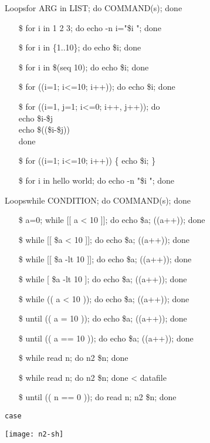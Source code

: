 \begin{frame}{Loops}{\ttfamily for ARG in LIST; do COMMAND(s); done}\small\ttfamily
\begin{itemize}
\item[\$] for i in 1 2 3; do echo -n i="\$i "; done
\item[\$] for i in \{1..10\}; do echo \$i; done
\item[\$] for i in \$(seq 10); do echo \$i; done
\item[\$] for ((i=1; i<=10; i++)); do echo \$i; done
\item[\$] for ((i=1, j=1; i<=0; i++, j++)); do\\
  echo \$i-\$j\\
  echo \$((\$i-\$j))\\
  done
\item[\$] for ((i=1; i<=10; i++)) \{ echo \$i; \}
\item[\$] for i in hello world; do echo -n "\$i "; done
\end{itemize}
\end{frame}

\begin{frame}{Loops}{\ttfamily while CONDITION; do COMMAND(s); done}\small\ttfamily
\begin{itemize}
\item[\$] a=0; while [[ a < 10 ]]; do echo \$a; ((a++)); done \Bad
\item[\$] while [[ \$a < 10 ]]; do echo \$a; ((a++)); done \Bad
\item[\$] while [[ \$a -lt 10 ]]; do echo \$a; ((a++)); done \correct
\item[\$] while [ \$a -lt 10 ]; do echo \$a; ((a++)); done \correct
\item[\$] while (( a < 10 )); do echo \$a; ((a++)); done \correct
\item[\$] until (( a = 10 )); do echo \$a; ((a++)); done \Bad
\item[\$] until (( a == 10 )); do echo \$a; ((a++)); done \correct
\item[\$] while read n; do n2 \$n; done
\item[\$] while read n; do n2 \$n; done < datafile
\item[\$] until (( n == 0 )); do read n; n2 \$n; done
\end{itemize}
\end{frame}

\begin{frame}{\texttt{case}}
  \begin{center}
    \texttt{[image: n2-sh]}
  \end{center}
\end{frame}

